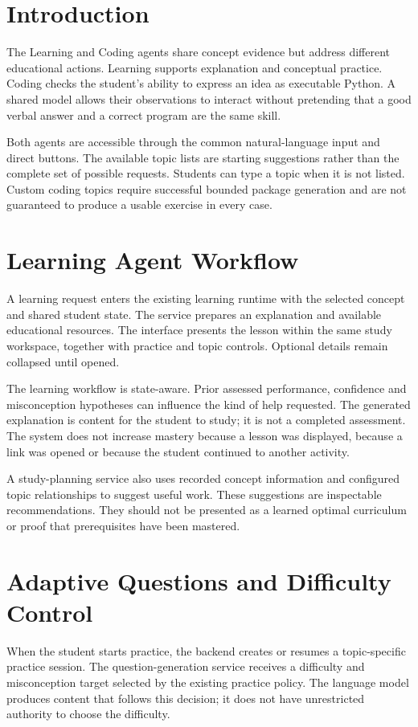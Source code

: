 \section{Introduction}
The Learning and Coding agents share concept evidence but address different educational actions. Learning supports explanation and conceptual practice. Coding checks the student's ability to express an idea as executable Python. A shared model allows their observations to interact without pretending that a good verbal answer and a correct program are the same skill.

Both agents are accessible through the common natural-language input and direct buttons. The available topic lists are starting suggestions rather than the complete set of possible requests. Students can type a topic when it is not listed. Custom coding topics require successful bounded package generation and are not guaranteed to produce a usable exercise in every case.

\section{Learning Agent Workflow}
A learning request enters the existing learning runtime with the selected concept and shared student state. The service prepares an explanation and available educational resources. The interface presents the lesson within the same study workspace, together with practice and topic controls. Optional details remain collapsed until opened.

The learning workflow is state-aware. Prior assessed performance, confidence and misconception hypotheses can influence the kind of help requested. The generated explanation is content for the student to study; it is not a completed assessment. The system does not increase mastery because a lesson was displayed, because a link was opened or because the student continued to another activity.

A study-planning service also uses recorded concept information and configured topic relationships to suggest useful work. These suggestions are inspectable recommendations. They should not be presented as a learned optimal curriculum or proof that prerequisites have been mastered.

\section{Adaptive Questions and Difficulty Control}
When the student starts practice, the backend creates or resumes a topic-specific practice session. The question-generation service receives a difficulty and misconception target selected by the existing practice policy. The language model produces content that follows this decision; it does not have unrestricted authority to choose the difficulty.

